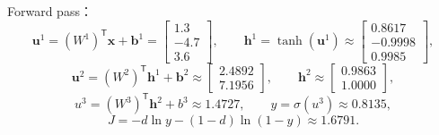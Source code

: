 \begin{checkedsolution}
Forward pass：
\[
  \bm u^1=(W^1)^{\mathsf T}\bm x+\bm b^1
  =\begin{bmatrix}1.3\\-4.7\\3.6\end{bmatrix},
  \qquad
  \bm h^1=\tanh(\bm u^1)
  \approx\begin{bmatrix}0.8617\\-0.9998\\0.9985\end{bmatrix},
\]
\[
  \bm u^2=(W^2)^{\mathsf T}\bm h^1+\bm b^2
  \approx\begin{bmatrix}2.4892\\7.1956\end{bmatrix},
  \qquad
  \bm h^2\approx\begin{bmatrix}0.9863\\1.0000\end{bmatrix},
\]
\[
  u^3=(W^3)^{\mathsf T}\bm h^2+b^3\approx1.4727,
  \qquad
  y=\sigma(u^3)\approx0.8135,
\]
\[
  J=-d\ln y-(1-d)\ln(1-y)\approx\boxed{1.6791}.
\]


\end{checkedsolution}
